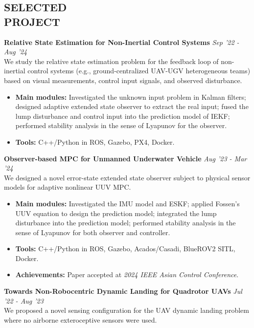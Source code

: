 \documentclass[overlapped]{res}
\begin{document}
\begin{resume}
\section{SELECTED\\PROJECT}

\textbf{Relative State Estimation for Non-Inertial Control Systems}  
\hfill \textit{Sep '22 - Aug '24} \\
We study the relative state estimation problem for the feedback loop of non-inertial control systems (e.g., ground-centralized UAV-UGV heterogeneous teams) based on visual measurements, control input signals, and observed disturbance. 

\begin{itemize}
  \item \textbf{Main modules:} Investigated the unknown input problem in Kalman filters; designed adaptive extended state observer to extract the real input; fused the lump disturbance and control input into the prediction model of IEKF; performed stability analysis in the sense of Lyapunov for the observer.
  \item \textbf{Tools:} C++/Python in ROS, Gazebo, PX4, Docker.
\end{itemize}

\textbf{Observer-based MPC for Unmanned Underwater Vehicle}  
\hfill \textit{Aug '23 - Mar  '24} \\
We designed a novel error-state extended state observer subject to physical sensor models for adaptive nonlinear UUV MPC. 

\begin{itemize}
  \item \textbf{Main modules:} Investigated the IMU model and ESKF; applied Fossen's UUV equation to design the prediction model; integrated the lump disturbance into the prediction model; performed stability analysis in the sense of Lyapunov for both observer and controller.
  \item \textbf{Tools:} C++/Python in ROS, Gazebo, Acados/Casadi, BlueROV2 SITL, Docker.
  \item \textbf{Achievements:} Paper accepted at \textit{2024 IEEE Asian Control Conference}.
\end{itemize}

\textbf{Towards Non-Robocentric Dynamic Landing for Quadrotor UAVs} 
\hfill \textit{Jul '22 - Aug  '23} \\
We proposed a novel sensing configuration for the UAV dynamic landing problem where no airborne exteroceptive sensors were used.


\end{resume}
\end{document}
